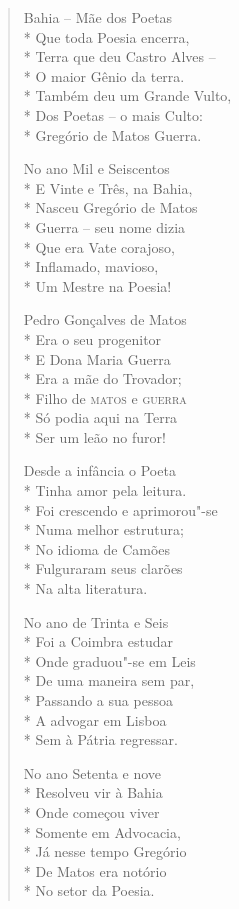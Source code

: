 \begin{verse}
Bahia -- Mãe dos Poetas\\*
Que toda Poesia encerra,\\*
Terra que deu Castro Alves --\\*
O maior Gênio da terra.\\*
Também deu um Grande Vulto,\\*
Dos Poetas -- o mais Culto:\\*
Gregório de Matos Guerra.

No ano Mil e Seiscentos\\*
E Vinte e Três, na Bahia,\\*
Nasceu Gregório de Matos\\*
Guerra -- seu nome dizia\\*
Que era Vate corajoso,\\*
Inflamado, mavioso,\\*
Um Mestre na Poesia!

Pedro Gonçalves de Matos\\*
Era o seu progenitor\\*
E Dona Maria Guerra\\*
Era a mãe do Trovador;\\*
Filho de \textsc{matos} e \textsc{guerra}\\*
Só podia aqui na Terra\\*
Ser um leão no furor!

Desde a infância o Poeta\\*
Tinha amor pela leitura.\\*
Foi crescendo e aprimorou"-se\\*
Numa melhor estrutura;\\*
No idioma de Camões\\*
Fulguraram seus clarões\\*
Na alta literatura.

No ano de Trinta e Seis\\*
Foi a Coimbra estudar\\*
Onde graduou"-se em Leis\\*
De uma maneira sem par,\\*
Passando a sua pessoa\\*
A advogar em Lisboa\\*
Sem à Pátria regressar.

No ano Setenta e nove\\*
Resolveu vir à Bahia\\*
Onde começou viver\\*
Somente em Advocacia,\\*
Já nesse tempo Gregório\\*
De Matos era notório\\*
No setor da Poesia.


\end{verse}
